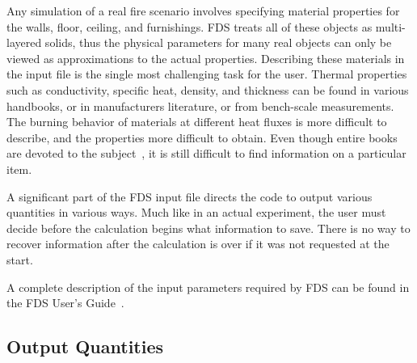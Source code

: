 \documentclass[11pt]{book}
\begin{document}
Any simulation of a real fire scenario involves specifying material properties for the walls, floor, ceiling,
and furnishings. FDS treats all of these objects as multi-layered solids, thus the physical parameters for many real
objects can only be viewed as approximations to the actual properties. Describing these materials in the input file is
the single most challenging task for the user. Thermal properties such as conductivity, specific heat,
density, and thickness can be found in various handbooks, or in manufacturers literature, or from bench-scale measurements.
The burning behavior of materials at different heat fluxes is more difficult to describe, and the properties more difficult
to obtain. Even though entire books are devoted to the
subject~\cite{Babrauskas:2}, it is still difficult to find information on a particular item.

A significant part of the FDS input file directs the code to output various quantities in various ways. Much like in an
actual experiment, the user must decide before the calculation begins what information to save. There is no way to
recover information after the calculation is over if it was not requested at the start.

A complete description of the input parameters required by FDS can be found in the FDS User's Guide~\cite{FDS_Users_Guide_5}.


\subsection{Output Quantities}
\end{document}

